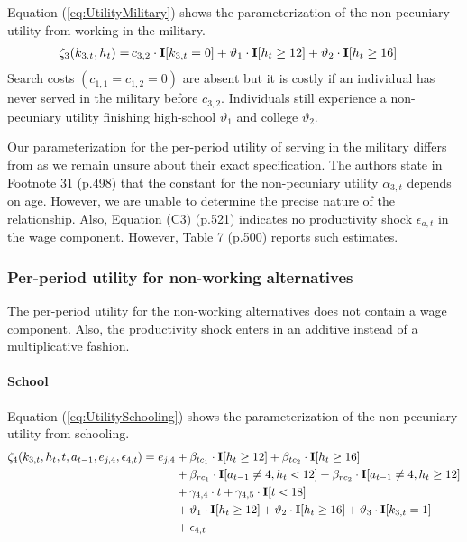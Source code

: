 \noindent Equation (\ref{eq:UtilityMilitary}) shows the parameterization of the non-pecuniary utility from working in the military.
%
\begin{align}\label{eq:UtilityMilitary}
\zeta_{3}( k_{3.t}, h_t)  = \,& c_{3,2} \cdot {\textbf{I}}[k_{3,t} = 0]+ \vartheta_1 \cdot {\textbf{I}}[h_t \geq 12] + \vartheta_2 \cdot {\textbf{I}}[h_t \geq 16]
\end{align}
%
Search costs $(c_{1, 1} = c_{1, 2} = 0)$ are absent but it is costly if an individual has never served in the military before $c_{3,2}$. Individuals still experience a non-pecuniary utility finishing high-school $\vartheta_1$ and college $\vartheta_2$.


\begin{Remark} Our parameterization for the per-period utility of serving in the military differs from \citet{Keane.1997} as we remain unsure about their exact specification. The authors state in Footnote 31 (p.498) that the constant for the non-pecuniary utility $\alpha_{3,t}$ depends on age. However, we are unable to determine the precise nature of the relationship. Also, Equation (C3) (p.521) indicates no productivity shock $\epsilon_{a,t}$ in the wage component. However, Table 7 (p.500) reports such estimates.
\end{Remark}
\FloatBarrier\subsubsection*{Per-period utility for non-working alternatives}
The per-period utility for the non-working alternatives does not contain a wage component. Also, the productivity shock enters in an additive instead of a multiplicative fashion.
\FloatBarrier\paragraph*{School}
Equation (\ref{eq:UtilitySchooling}) shows the parameterization of the non-pecuniary utility from schooling.
%
\begin{align}\label{eq:UtilitySchooling}
	\zeta_4(k_{3,t}, h_t, t, a_{t-1}, e_{j,4}, \epsilon_{4,t})  = e_{j,4} & + \beta_{tc_1} \cdot {\textbf{I}}[h_t \geq 12] + \beta_{tc_2} \cdot {\textbf{I}}[h_t \geq 16]   \\\nonumber
    							  & + \beta_{rc_1} \cdot {\textbf{I}}[a_{t-1} \neq 4, h_t < 12] + \beta_{rc_2} \cdot {\textbf{I}}[a_{t-1} \neq 4, h_t \geq 12] \\\nonumber
    							  & + \gamma_{4,4} \cdot t + \gamma_{4,5} \cdot {\textbf{I}}[t < 18] 																					  \\\nonumber
     							  & + \vartheta_1 \cdot {\textbf{I}}[h_t \geq 12] + \vartheta_2 \cdot {\textbf{I}}[h_t \geq 16] + \vartheta_3 \cdot {\textbf{I}}[k_{3,t} = 1]\\\nonumber
      							& + \epsilon_{4,t}
\end{align}
